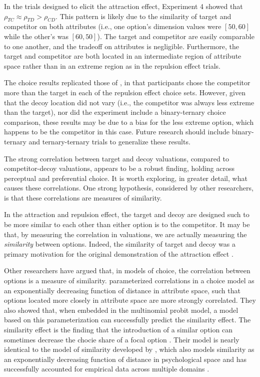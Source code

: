 In the trials designed to elicit the attraction effect, Experiment 4 showed that $\rho_{TC}\approx\rho_{TD}>\rho_{CD}$. This pattern is likely due to the similarity of target and competitor on both attributes (i.e., one option's dimension values were $[50,60]$ while the other's was $[60,50]$). The target and competitor are easily comparable to one another, and the tradeoff on attributes is negligible. Furthermore, the target and competitor are both located in an intermediate region of attribute space rather than in an extreme region as in the repulsion effect trials.

The choice results replicated those of \textcite{banerjeeFactorsThatPromote2024}, in that participants chose the competitor more than the target in each of the repulsion effect choice sets. However, given that the decoy location did not vary (i.e., the competitor was always less extreme than the target), nor did the experiment include a binary-ternary choice comparison, these results may be due to a bias for the less extreme option, which happens to be the competitor in this case. Future research should include binary-ternary and ternary-ternary trials to generalize these results.

The strong correlation between target and decoy valuations, compared to competitor-decoy valuations, appears to be a robust finding, holding across perceptual and preferential choice. It is worth exploring, in greater detail, what causes these correlations. One strong hypothesis, considered by other researchers, is that these correlations are measures of similarity. 

In the attraction and repulsion effect, the target and decoy are designed such to be more similar to each other than either option is to the competitor. It may be that, by measuring the correlation in valuations, we are actually measuring the \textit{similarity} between options. Indeed, the similarity of target and decoy was a primary motivation for the original demonstration of the attraction effect \parencite{huberAddingAsymmetricallyDominated1982d}. 

Other researchers have argued that, in models of choice, the correlation between options is a measure of similarity. \textcite{kamakura1984predicting} parameterized correlations in a choice model as an exponentially decreasing function of distance in attribute space, such that options located more closely in attribute space are more strongly correlated. They also showed that, when embedded in the multinomial probit model, a model based on this parameterization can successfully predict the similarity effect. The similarity effect is the finding that the introduction of a similar option can sometimes decrease the chocie share of a focal option \textcite{tverskyEliminationAspectsTheory1972}. Their model is nearly identical to the model of similarity developed by \textcite{shepardUniversalLawGeneralization1987c}, which also models similarity as an exponentially decreasing function of distance in psychological space and has successfully accounted for empirical data across multiple domains \parencite{nosofskyAttentionSimilarityIdentificationCategorization1986,roads2024modeling,townsend1971theoretical}. 

